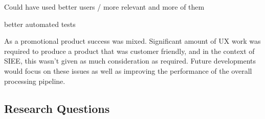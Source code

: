 Could have used better users / more relevant and more of them

better automated tests

As a promotional product success was mixed.
Significant amount of UX work was required to produce a product that was customer friendly,
and in the context of SIEE, this wasn't given as much consideration as required.
Future developments would focus on these issues as well as improving the performance of the overall processing pipeline.

\subsection{Research Questions}\label{subsec:research-questions2}